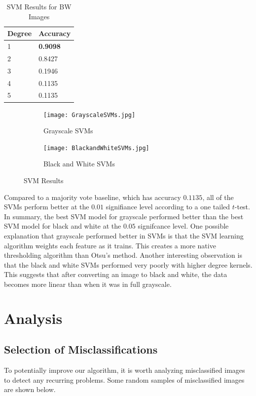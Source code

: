 \documentclass[12pt]{article}
\begin{document}
\begin{table}[ht!]
\centering
\caption{SVM Results for BW Images}
    \begin{tabular}{|l|l|}
    \hline
    Degree & Accuracy \\ \hline
    1      & \textbf{0.9098}   \\ \hline
    2      & 0.8427   \\ \hline
    3      & 0.1946   \\ \hline
    4      & 0.1135   \\ \hline
    5      & 0.1135   \\ \hline
    \end{tabular}
\end{table}

\begin{figure}[h]
\centering
\begin{subfigure}{.45\textwidth}
  \centering
  \texttt{[image: GrayscaleSVMs.jpg]}
  \caption{Grayscale SVMs}
  \label{fig:sub1}
\end{subfigure}%
\hspace{2mm}
\begin{subfigure}{.45\textwidth}
  \centering
  \texttt{[image: BlackandWhiteSVMs.jpg]}
  \caption{Black and White SVMs}
  \label{fig:sub2}
\end{subfigure}
\caption{SVM Results}
\label{fig:test}
\end{figure}

Compared to a majority vote baseline, which has accuracy $0.1135$, all of the SVMs perform better at the $0.01$ signifiance level according to a one tailed $t$-test. In summary, the best SVM model for grayscale performed better than the best SVM model for black and white at the $0.05$ signifcance level. One possible explanation that grayscale performed better in SVMs is that the SVM learning algorithm weights each feature as it trains. This creates a more native thresholding algorithm than Otsu's method. Another interesting observation is that the black and white SVMs performed very poorly with higher degree kernels. This suggests that after converting an image to black and white, the data becomes more linear than when it was in full grayscale.

\section*{Analysis}
\subsection*{Selection of Misclassifications}
To potentially improve our algorithm, it is worth analyzing misclassified images to detect any recurring problems. Some random samples of misclassified images are shown below.
\end{document}
